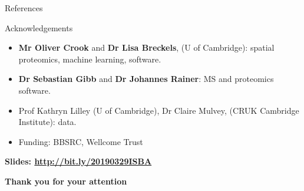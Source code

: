 \documentclass[presentation]{beamer}
\begin{document}
\begin{frame}[allowframebreaks]{References}
  \tiny
  
  
\end{frame}


\begin{frame}
  \begin{block}{Acknowledgements}
    \begin{itemize}
    \item \textbf{Mr Oliver Crook} and \textbf{Dr Lisa Breckels}, (U
      of Cambridge): spatial proteomics, machine learning, software.
    \item \textbf{Dr Sebastian Gibb} and \textbf{Dr Johannes Rainer}:
      MS and proteomics software.
    \item Prof Kathryn Lilley (U of Cambridge), Dr Claire Mulvey,
      (CRUK Cambridge Institute): data.
    \item Funding: BBSRC, Wellcome Trust
    \end{itemize}
  \end{block}

  
  \begin{center}
    \textbf{Slides: \url{http://bit.ly/20190329ISBA}}
    
    \bigskip
    
    \textbf{Thank you for your attention}
  \end{center}

\end{frame}


\end{document}
